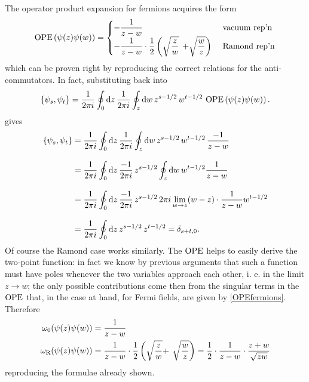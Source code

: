 \begin{example}
 The operator product expansion for fermions acquires the
 form
 \begin{equation}
 \label{OPEfermions}
 \operatorname{OPE}\left(\psi(z)\psi(w)\right)=
 \begin{cases}
 -\dfrac{1}{z-w}&\mbox{ vacuum rep'n}\\
 -\dfrac{1}{z-w}\cdot\dfrac{1}{2}\left(\sqrt{\dfrac{z}{w}}\right.
 \left. +\sqrt{\dfrac{w}{z}}\right)&\mbox{ Ramond rep'n}
 \end{cases}
 \end{equation}
 which can be proven right by reproducing the correct 
 relations for the anti-commutators. In fact, substituting back into
 \[
 \{\psi_s,\psi_t\}=\frac{1}{2\pi i}\oint_0 \textrm{d} z\,
 \frac{1}{2\pi i}\oint_{z} \textrm{d} w\,
 z^{s-1/2}\,w^{t-1/2}\,\operatorname{OPE}\left(\psi(z)\psi(w)\right).
 \]
 gives
 \begin{align*}
 \{\psi_s,\psi_t\}&=\frac{1}{2\pi i}\oint_0 \textrm{d} z\,
 \frac{1}{2\pi i}\oint_{z} \textrm{d} w\,
 z^{s-1/2}\,w^{t-1/2}\,\frac{-1}{z-w}\\[2ex]
 &=\frac{1}{2\pi i}\oint_0 \textrm{d} z\, \frac{-1}{2\pi i}
 \,z^{s-1/2}\oint_z \textrm{d} w\, w^{t-1/2}\frac{1}{z-w}\\[2ex]
 &=\frac{1}{2\pi i}\oint_0 \textrm{d} z\, \frac{-1}{2\pi i}
 \,z^{s-1/2}\,2\pi i \lim_{w\to z}(w-z)\cdot\frac{1}{z-w}
 w^{t-1/2}\\[2ex]
 &=\frac{1}{2\pi i}\oint_0\textrm{d} z\,z^{s-1/2}\,z^{t-1/2}
 =\delta_{s+t,0}.
 \end{align*}
 Of course the Ramond case works similarly. The $\operatorname{OPE}$
 helps to easily derive the two-point function: in
 fact we know by previous arguments that such a 
 function must have poles whenever the two variables
 approach each other, i. e. in the limit $z\to w$;
 the only possible contributions come then from the
 singular terms in the $\operatorname{OPE}$ that, in the case at hand,
 for Fermi fields, are given by \eqref{OPEfermions}. Therefore
 \begin{align*}
 \omega_0(\psi(z)\psi(w))&=\frac{1}{z-w}\\
 \omega_{\textrm{R}}(\psi(z)\psi(w))&=\frac{1}{z-w}\cdot 
 \frac{1}{2}\left(\sqrt{\frac{z}{w}}+\right.
 \left.\sqrt{\frac{w}{z}}\right)=\frac{1}{2}\cdot
 \frac{1}{z-w}\cdot\frac{z+w}{\sqrt{zw}}
 \end{align*}
 reproducing the formulae already shown.
 \end{example}
